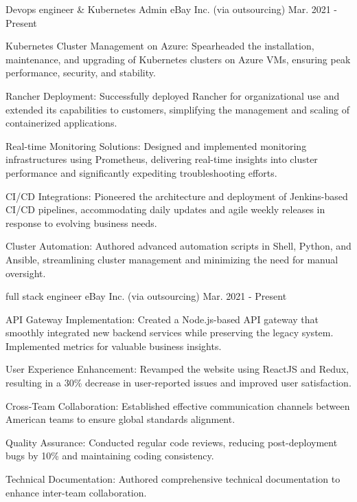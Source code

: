 \begin{cventries}
  \cventry
    {Devops engineer \& Kubernetes Admin} %
    {eBay Inc. \tiny{(via outsourcing)}} %
    {} %
    {Mar. 2021 - Present} %
    {
      \begin{cvitems} %
        \item {Kubernetes Cluster Management on Azure: Spearheaded the installation, maintenance, and upgrading of Kubernetes clusters on Azure VMs, ensuring peak performance, security, and stability.}
        \item {Rancher Deployment: Successfully deployed Rancher for organizational use and extended its capabilities to customers, simplifying the management and scaling of containerized applications.}
        \item {Real-time Monitoring Solutions: Designed and implemented monitoring infrastructures using Prometheus, delivering real-time insights into cluster performance and significantly expediting troubleshooting efforts.        }
        \item {CI/CD Integrations: Pioneered the architecture and deployment of Jenkins-based CI/CD pipelines, accommodating daily updates and agile weekly releases in response to evolving business needs.        }
        \item {Cluster Automation: Authored advanced automation scripts in Shell, Python, and Ansible, streamlining cluster management and minimizing the need for manual oversight.        }
      \end{cvitems}
    }
  \cventry
    {full stack engineer } %
    {eBay Inc. \tiny{(via outsourcing)}} %
    {} %
    {Mar. 2021 - Present} %
    {
      \begin{cvitems} %
        \item {API Gateway Implementation: Created a Node.js-based API gateway that smoothly integrated new backend services while preserving the legacy system. Implemented metrics for valuable business insights.}
        \item {User Experience Enhancement: Revamped the website using ReactJS and Redux, resulting in a 30\% decrease in user-reported issues and improved user satisfaction.  }
        \item {Cross-Team Collaboration: Established effective communication channels between American teams to ensure global standards alignment.    }
        \item {Quality Assurance: Conducted regular code reviews, reducing post-deployment bugs by 10\% and maintaining coding consistency.    }
        \item {Technical Documentation: Authored comprehensive technical documentation to enhance inter-team collaboration.    }
      \end{cvitems}
    }


\end{cventries}
